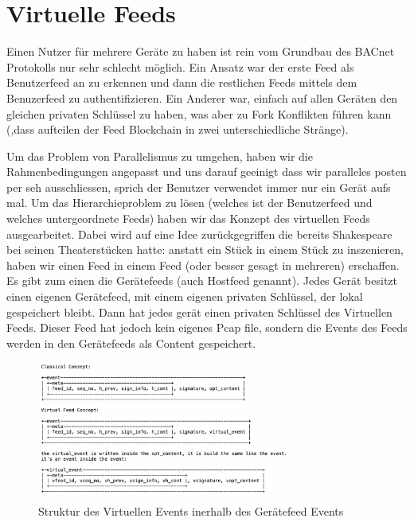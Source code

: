 \documentclass[a4paper,titlepage]{article}
\begin{document}
\section{Virtuelle Feeds}

Einen Nutzer für mehrere Geräte zu haben ist rein vom Grundbau des BACnet Protokolls nur sehr schlecht möglich. Ein Ansatz war der erste Feed als Benutzerfeed an zu erkennen und dann die restlichen Feeds mittels dem Benuzerfeed zu authentifizieren. Ein Anderer war, einfach auf allen Geräten den gleichen privaten Schlüssel zu haben, was aber zu Fork Konflikten führen kann (,dass aufteilen der Feed Blockchain in zwei unterschiedliche Stränge).

Um das Problem von Parallelismus zu umgehen, haben wir die Rahmenbedingungen angepasst und uns darauf geeinigt dass wir paralleles posten per seh ausschliessen, sprich der Benutzer verwendet immer nur ein Gerät aufs mal. Um das Hierarchieproblem zu lösen (welches ist der Benutzerfeed und welches untergeordnete Feeds) haben wir das Konzept des virtuellen Feeds ausgearbeitet. Dabei wird auf eine Idee zurückgegriffen die bereits Shakespeare bei seinen Theaterstücken hatte: anstatt ein Stück in einem Stück zu inszenieren, haben wir einen Feed in einem Feed (oder besser gesagt in mehreren) erschaffen. Es gibt zum einen die Gerätefeeds (auch Hostfeed genannt). Jedes Gerät besitzt einen eigenen Gerätefeed, mit einem eigenen privaten Schlüssel, der lokal gespeichert bleibt. Dann hat jedes gerät einen privaten Schlüssel des Virtuellen Feeds. Dieser Feed hat jedoch kein eigenes Pcap file, sondern die Events des Feeds werden in den Gerätefeeds als Content gespeichert.

\begin{figure}[h!]
   \centering
   \includegraphics[width=0.75\textwidth]{figures/vFeedStructure}  
   \caption*{Struktur des Virtuellen Events inerhalb des Gerätefeed Events }
   \label{fig-virtual_event_structure}
\end{figure}
\end{document}
